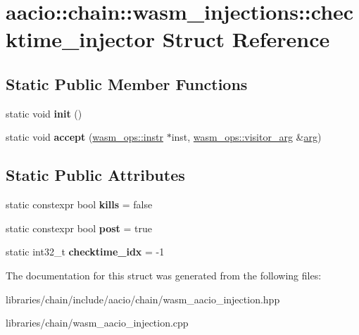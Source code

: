 \hypertarget{structaacio_1_1chain_1_1wasm__injections_1_1checktime__injector}{}\section{aacio\+:\+:chain\+:\+:wasm\+\_\+injections\+:\+:checktime\+\_\+injector Struct Reference}
\label{structaacio_1_1chain_1_1wasm__injections_1_1checktime__injector}
\subsection*{Static Public Member Functions}
\begin{DoxyCompactItemize}
\item 
\mbox{\label{structaacio_1_1chain_1_1wasm__injections_1_1checktime__injector_a25c398718ba8b2ad60ed450ea29e23ad}} 
static void {\bfseries init} ()
\item 
\mbox{\label{structaacio_1_1chain_1_1wasm__injections_1_1checktime__injector_a149d17dba1904360aa045256c8346bd4}} 
static void {\bfseries accept} (\mbox{\hyperlink{structaacio_1_1chain_1_1wasm__ops_1_1instr}{wasm\+\_\+ops\+::instr}} $\ast$inst, \mbox{\hyperlink{structaacio_1_1chain_1_1wasm__ops_1_1visitor__arg}{wasm\+\_\+ops\+::visitor\+\_\+arg}} \&\mbox{\hyperlink{unionarg}{arg}})
\end{DoxyCompactItemize}
\subsection*{Static Public Attributes}
\begin{DoxyCompactItemize}
\item 
\mbox{\label{structaacio_1_1chain_1_1wasm__injections_1_1checktime__injector_acc95d0542809d1cca88c00c13890cb55}} 
static constexpr bool {\bfseries kills} = false
\item 
\mbox{\label{structaacio_1_1chain_1_1wasm__injections_1_1checktime__injector_a9a4ddc45f79a41eb363fe516fcf31aec}} 
static constexpr bool {\bfseries post} = true
\item 
\mbox{\label{structaacio_1_1chain_1_1wasm__injections_1_1checktime__injector_a8e1245c69ed0b7211cc8dcae04b146ed}} 
static int32\+\_\+t {\bfseries checktime\+\_\+idx} = -\/1
\end{DoxyCompactItemize}


The documentation for this struct was generated from the following files\+:\begin{DoxyCompactItemize}
\item 
libraries/chain/include/aacio/chain/wasm\+\_\+aacio\+\_\+injection.\+hpp\item 
libraries/chain/wasm\+\_\+aacio\+\_\+injection.\+cpp\end{DoxyCompactItemize}
